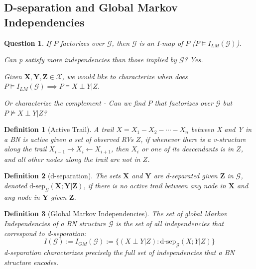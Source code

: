 \documentclass[11pt]{article}
\numberwithin{equation}{section}
\theoremstyle{boldStyle}
\newtheorem{question}{Question}[section]
\theoremstyle{boldBlueStyle}
\theoremstyle{boldPurpleStyle}
\theoremstyle{boldRedStyle}
\newtheorem{definition}{Definition}[section]
\begin{document}
\subsection{D-separation and Global Markov Independencies}

\begin{question}
    If $P$ factorizes over $\mathcal{G}$, then $\mathcal{G}$ is an I-map of $P$ ($P \models I_{LM}(\mathcal{G})$).

    Can p satisfy more independencies than those implied by $\mathcal{G}$? Yes. 

    Given $\textbf{X}, \textbf{Y}, \textbf{Z}\in \mathcal{X}$, we would like to characterize when does $P \models I_{LM}(\mathcal{G}) \implies P \models X \perp Y | Z$.

    Or characterize the complement - Can we find $P$ that factorizes over $\mathcal{G}$ but $P \not\models X \perp Y | Z$?

\end{question}

\begin{definition}[Active Trail]
    A trail $X = X_1 - X_2 - \cdots - X_n$ between X and Y in a BN is active given a set of observed RVs $Z$,
    if whenever there is a v-structure along the trail $X_{i-1} \rightarrow X_{i} \leftarrow X_{i+1}$, then $X_{i}$ or one of its descendants is in $Z$, 
    and all other nodes along the trail are not in $Z$.
\end{definition}

\begin{definition}[d-separation]
    The sets $\textbf{X}$ and $\textbf{Y}$ are d-separated given $\textbf{Z}$ in $\mathcal{G}$, denoted $\text{d-sep}_{\mathcal{G}}(\textbf{X};\textbf{Y} | \textbf{Z})$,
    if there is no active trail between any node in $\textbf{X}$ and any node in $\textbf{Y}$ given $\textbf{Z}$.
\end{definition}

\begin{definition}[Global Markov Independencies]
    The set of global Markov Independencies of a BN structure $\mathcal{G}$ is the set of all independencies that correspond to d-separation:
    \begin{equation*}
        I(\mathcal{G}) := I_{GM}(\mathcal{G}) := \{ (X \perp Y | Z) : \text{d-sep}_{\mathcal{G}}(X;Y | Z) \}
    \end{equation*}
    d-separation characterizes precisely the full set of independencies that a BN structure encodes.
\end{definition}
\end{document}
